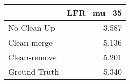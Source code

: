 \begin{tabular}{lr}
\toprule
{} & LFR_mu_35 \\
\midrule
No Clean Up  &     3.587 \\
Clean-merge  &     5.136 \\
Clean-remove &     5.201 \\
Ground Truth &     5.340 \\
\bottomrule
\end{tabular}
